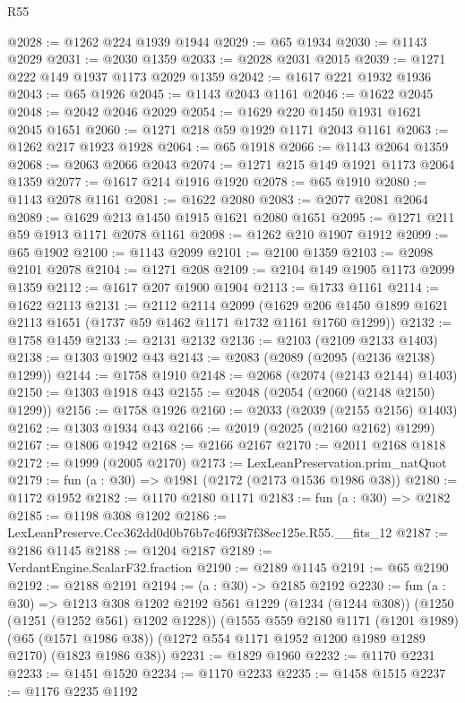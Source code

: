 \begin{lexlean}{R55}
\begin{coremodule}
@2028 := @1262 @224 @1939 @1944
@2029 := @65 @1934
@2030 := @1143 @2029
@2031 := @2030 @1359
@2033 := @2028 @2031 @2015
@2039 := @1271 @222 @149 @1937 @1173 @2029 @1359
@2042 := @1617 @221 @1932 @1936
@2043 := @65 @1926
@2045 := @1143 @2043 @1161
@2046 := @1622 @2045
@2048 := @2042 @2046 @2029
@2054 := @1629 @220 @1450 @1931 @1621 @2045 @1651
@2060 := @1271 @218 @59 @1929 @1171 @2043 @1161
@2063 := @1262 @217 @1923 @1928
@2064 := @65 @1918
@2066 := @1143 @2064 @1359
@2068 := @2063 @2066 @2043
@2074 := @1271 @215 @149 @1921 @1173 @2064 @1359
@2077 := @1617 @214 @1916 @1920
@2078 := @65 @1910
@2080 := @1143 @2078 @1161
@2081 := @1622 @2080
@2083 := @2077 @2081 @2064
@2089 := @1629 @213 @1450 @1915 @1621 @2080 @1651
@2095 := @1271 @211 @59 @1913 @1171 @2078 @1161
@2098 := @1262 @210 @1907 @1912
@2099 := @65 @1902
@2100 := @1143 @2099
@2101 := @2100 @1359
@2103 := @2098 @2101 @2078
@2104 := @1271 @208
@2109 := @2104 @149 @1905 @1173 @2099 @1359
@2112 := @1617 @207 @1900 @1904
@2113 := @1733 @1161
@2114 := @1622 @2113
@2131 := @2112
    @2114
    @2099
    (@1629 @206 @1450 @1899 @1621 @2113 @1651 (@1737 @59 @1462 @1171 @1732 @1161 @1760 @1299))
@2132 := @1758 @1459
@2133 := @2131 @2132
@2136 := @2103 (@2109 @2133 @1403)
@2138 := @1303 @1902 @43
@2143 := @2083 (@2089 (@2095 (@2136 @2138) @1299))
@2144 := @1758 @1910
@2148 := @2068 (@2074 (@2143 @2144) @1403)
@2150 := @1303 @1918 @43
@2155 := @2048 (@2054 (@2060 (@2148 @2150) @1299))
@2156 := @1758 @1926
@2160 := @2033 (@2039 (@2155 @2156) @1403)
@2162 := @1303 @1934 @43
@2166 := @2019 (@2025 (@2160 @2162) @1299)
@2167 := @1806 @1942
@2168 := @2166 @2167
@2170 := @2011 @2168 @1818
@2172 := @1999 (@2005 @2170)
@2173 := LexLeanPreservation.prim_natQuot
@2179 := fun (a : @30) => @1981 (@2172 (@2173 @1536 @1986 @38))
@2180 := @1172 @1952
@2182 := @1170 @2180 @1171
@2183 := fun (a : @30) => @2182
@2185 := @1198 @308 @1202
@2186 := LexLeanPreserve.Ccc362dd0d0b76b7c46f93f7f38ec125e.R55.__fits_12
@2187 := @2186 @1145
@2188 := @1204 @2187
@2189 := VerdantEngine.ScalarF32.fraction
@2190 := @2189 @1145
@2191 := @65 @2190
@2192 := @2188 @2191
@2194 := (a : @30) -> @2185 @2192
@2230 := fun (a : @30) =>
  @1213
    @308
    @1202
    @2192
    @561
    @1229
    (@1234 (@1244 @308))
    (@1250 (@1251 (@1252 @561) @1202 @1228))
    (@1555
      @559
      @2180
      @1171
      (@1201 @1989)
      (@65 (@1571 @1986 @38))
      (@1272 @554 @1171 @1952 @1200 @1989 @1289 @2170)
      (@1823 @1986 @38))
@2231 := @1829 @1960
@2232 := @1170 @2231
@2233 := @1451 @1520
@2234 := @1170 @2233
@2235 := @1458 @1515
@2237 := @1176 @2235 @1192

\end{coremodule}
\end{lexlean}
